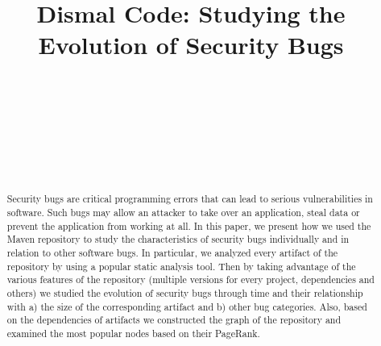 \documentclass[conference]{IEEEtran}
\begin{document}
\title{Dismal Code: Studying the Evolution of Security Bugs}

\author{
\\
\and
{}
\\
\and
{}
\\
\and
{}
\\
\and
{}
}

\maketitle

\begin{abstract}
Security bugs are critical programming errors that can lead to serious
vulnerabilities in software. Such bugs may allow an attacker to take over
an application, steal data or prevent the application from working at all.
In this paper, we present how we used the Maven repository to study the
characteristics of security bugs individually and in relation to other software
bugs. In particular, we analyzed every artifact of the repository by using a
popular static analysis tool. Then by taking advantage of the various features of
the repository (multiple versions for every project, dependencies and others) we studied
the evolution of security bugs through time and their relationship with a) the
size of the corresponding artifact and b) other bug categories. Also, based on the
dependencies of artifacts we constructed the graph of the repository and
examined the most popular nodes based on their PageRank. 
\end{abstract}
\end{document}
